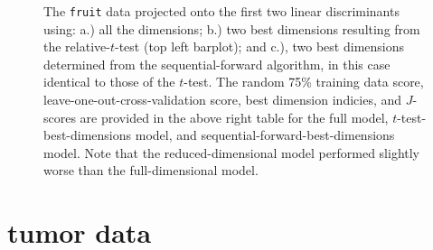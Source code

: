 \begin{figure}[H]
  \caption{The \texttt{fruit} data projected onto the first two linear discriminants using: a.) all the dimensions; b.) two best dimensions resulting from the relative-$t$-test (top left barplot); and c.), two best dimensions determined from the sequential-forward algorithm, in this case identical to those of the $t$-test.  The random 75\% training data score, leave-one-out-cross-validation score, best dimension indicies, and $J$-scores are provided in the above right table for the full model, $t$-test-best-dimensions model, and sequential-forward-best-dimensions model.  Note that the reduced-dimensional model performed slightly worse than the full-dimensional model.}
\end{figure}

\section{tumor data}

